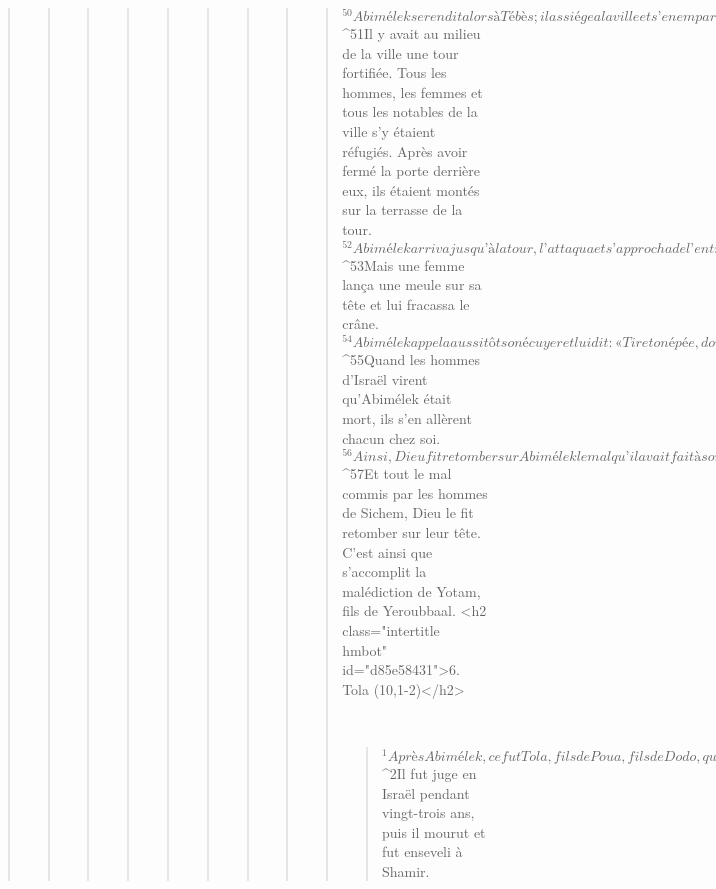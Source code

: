 \begin{verse}
\begin{verse}
\begin{verse}
\begin{verse}
\begin{verse}
\begin{verse}
\begin{verse}
\begin{verse}
\begin{verse}
${}^{50}Abimélek se rendit alors à Tébès ; il assiégea la ville et s’en empara. 
${}^{51}Il y avait au milieu de la ville une tour fortifiée. Tous les hommes, les femmes et tous les notables de la ville s’y étaient réfugiés. Après avoir fermé la porte derrière eux, ils étaient montés sur la terrasse de la tour. 
${}^{52}Abimélek arriva jusqu’à la tour, l’attaqua et s’approcha de l’entrée de la tour pour y mettre le feu. 
${}^{53}Mais une femme lança une meule sur sa tête et lui fracassa le crâne. 
${}^{54}Abimélek appela aussitôt son écuyer et lui dit : « Tire ton épée, donne-moi la mort, de peur que l’on ne dise de moi : “C’est une femme qui l’a tué.” » Alors son écuyer le transperça de son épée, et il mourut. 
${}^{55}Quand les hommes d’Israël virent qu’Abimélek était mort, ils s’en allèrent chacun chez soi.
${}^{56}Ainsi, Dieu fit retomber sur Abimélek le mal qu’il avait fait à son père en tuant ses soixante-dix frères. 
${}^{57}Et tout le mal commis par les hommes de Sichem, Dieu le fit retomber sur leur tête. C’est ainsi que s’accomplit la malédiction de Yotam, fils de Yeroubbaal.
      <h2 class="intertitle hmbot" id="d85e58431">6. Tola (10,1-2)</h2>
      
         
      \bchapter{}
      \begin{verse}
${}^{1}Après Abimélek, ce fut Tola, fils de Poua, fils de Dodo, qui se leva pour sauver Israël. Il était d’Issakar, et il habitait Shamir, dans la montagne d’Éphraïm. 
${}^{2}Il fut juge en Israël pendant vingt-trois ans, puis il mourut et fut enseveli à Shamir.
      

\end{verse}
\end{verse}
\end{verse}
\end{verse}
\end{verse}
\end{verse}
\end{verse}
\end{verse}
\end{verse}
\end{verse}
